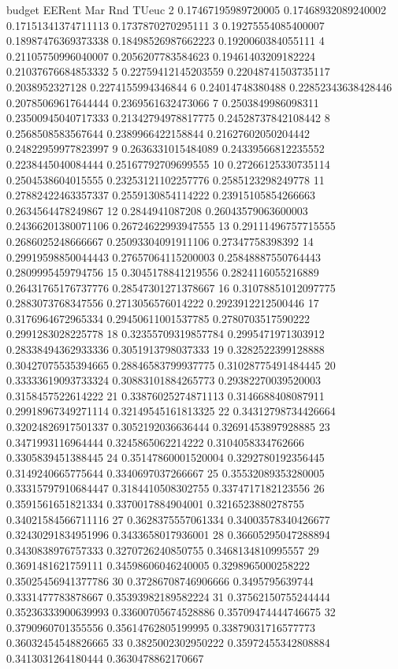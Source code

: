 budget EERent Mar Rnd TUeuc
2 0.17467195989720005 0.17468932089240002 0.17151341374711113 0.1737870270295111
3 0.19275554085400007 0.18987476369373338 0.18498526987662223 0.1920060384055111
4 0.21105750996040007 0.2056207783584623 0.19461403209182224 0.21037676684853332
5 0.22759412145203559 0.22048741503735117 0.2038952327128 0.2274155994346844
6 0.24014748380488 0.22852343638428446 0.20785069617644444 0.2369561632473066
7 0.2503849986098311 0.23500945040717333 0.21342794978817775 0.24528737842108442
8 0.2568508583567644 0.2389966422158844 0.21627602050204442 0.24822959977823997
9 0.2636331015484089 0.24339566812235552 0.2238445040084444 0.25167792709699555
10 0.27266125330735114 0.2504538604015555 0.23253121102257776 0.2585123298249778
11 0.27882422463357337 0.2559130854114222 0.23915105854266663 0.2634564478249867
12 0.2844941087208 0.26043579063600003 0.24366201380071106 0.26724622993947555
13 0.29111496757715555 0.2686025248666667 0.25093304091911106 0.27347758398392
14 0.29919598850044443 0.27657064115200003 0.25848887550764443 0.2809995459794756
15 0.3045178841219556 0.2824116055216889 0.26431765176737776 0.28547301271378667
16 0.31078851012097775 0.2883073768347556 0.2713056576014222 0.2923912212500446
17 0.3176964672965334 0.29450611001537785 0.2780703517590222 0.2991283028225778
18 0.32355709319857784 0.2995471971303912 0.28338494362933336 0.3051913798037333
19 0.3282522399128888 0.30427075535394665 0.28846583799937775 0.31028775491484445
20 0.33333619093733324 0.30883101884265773 0.29382270039520003 0.3158457522614222
21 0.33876025274871113 0.3146688408087911 0.29918967349271114 0.32149545161813325
22 0.34312798734426664 0.32024826917501337 0.3052192036636444 0.32691453897928885
23 0.3471993116964444 0.3245865062214222 0.3104058334762666 0.3305839451388445
24 0.35147860001520004 0.3292780192356445 0.3149240665775644 0.3340697037266667
25 0.35532089353280005 0.33315797910684447 0.3184410508302755 0.3374717182123556
26 0.3591561651821334 0.3370017884904001 0.3216523880278755 0.34021584566711116
27 0.3628375557061334 0.34003578340426677 0.32430291834951996 0.3433658017936001
28 0.36605295047288894 0.3430838976757333 0.3270726240850755 0.3468134810995557
29 0.3691481621759111 0.34598606046240005 0.3298965000258222 0.35025456941377786
30 0.37286708746906666 0.3495795639744 0.3331477783878667 0.35393982189582224
31 0.37562150755244444 0.35236333900639993 0.33600705674528886 0.35709474444746675
32 0.3790960701355556 0.35614762805199995 0.33879031716577773 0.36032454548826665
33 0.3825002302950222 0.35972455342808884 0.3413031264180444 0.3630478862170667
